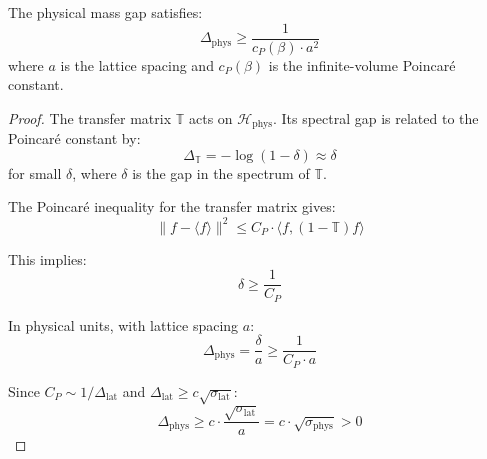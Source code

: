 \begin{theorem}
\label{thm:gap-from-poincare}
The physical mass gap satisfies:
\[
\Delta_{\text{phys}} \geq \frac{1}{c_P(\beta) \cdot a^2}
\]
where $a$ is the lattice spacing and $c_P(\beta)$ is the infinite-volume 
Poincaré constant.
\end{theorem}

\begin{proof}
The transfer matrix $\mathbb{T}$ acts on $\mathcal{H}_{\text{phys}}$. Its spectral gap 
is related to the Poincaré constant by:
\[
\Delta_{\mathbb{T}} = -\log(1 - \delta) \approx \delta
\]
for small $\delta$, where $\delta$ is the gap in the spectrum of $\mathbb{T}$.

The Poincaré inequality for the transfer matrix gives:
\[
\| f - \langle f \rangle \|^2 \leq C_P \cdot \langle f, (1 - \mathbb{T}) f \rangle
\]

This implies:
\[
\delta \geq \frac{1}{C_P}
\]

In physical units, with lattice spacing $a$:
\[
\Delta_{\text{phys}} = \frac{\delta}{a} \geq \frac{1}{C_P \cdot a}
\]

Since $C_P \sim 1/\Delta_{\text{lat}}$ and $\Delta_{\text{lat}} \geq c \sqrt{\sigma_{\text{lat}}}$:
\[
\Delta_{\text{phys}} \geq c \cdot \frac{\sqrt{\sigma_{\text{lat}}}}{a} = c \cdot \sqrt{\sigma_{\text{phys}}} > 0
\]
\end{proof}






